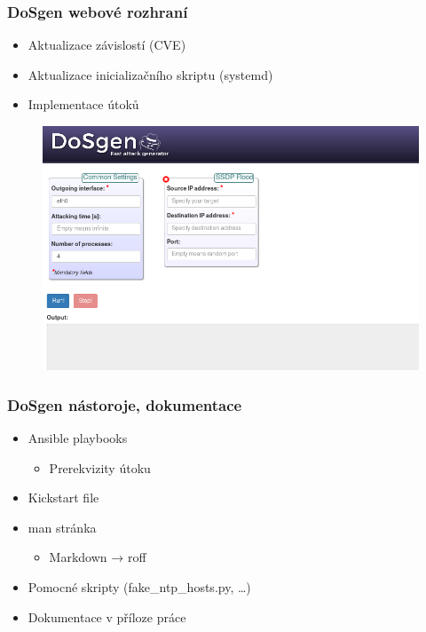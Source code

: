 \documentclass[%
  12pt,       				%
	t,                  %
	aspectratio=1610,   %
	unicode,						%
czech,              %
]{beamer}				    	%
\begin{document}

\begin{frame}
\frametitle{DoSgen webové rozhraní}
\begin{itemize}
	\item Aktualizace závislostí (CVE)
	\item Aktualizace inicializačního skriptu (systemd)
	\item Implementace útoků
\end{itemize}
\begin{figure}%
	\centering
	\vspace{0.25cm}	              %
	\includegraphics[width=0.62\columnwidth]{obrazky/dosgen-webui.png}
\end{figure}
\end{frame}


\begin{frame}
\frametitle{DoSgen nástoroje, dokumentace}
\begin{itemize}
\item Ansible playbooks
\begin{itemize}
	\item Prerekvizity útoku
\end{itemize}
\item Kickstart file
\item man stránka
\begin{itemize}
	\item Markdown → roff
\end{itemize}
\item Pomocné skripty (fake\_ntp\_hosts.py, \dots)
\item Dokumentace v příloze práce
\end{itemize}
\end{frame}

\end{document}
